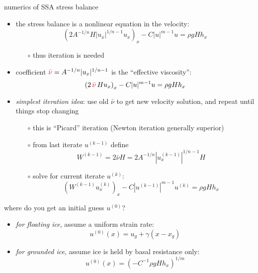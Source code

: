 \begin{frame}{numerics of SSA stress balance}

\begin{itemize}
\item the stress balance is a nonlinear equation in the velocity:
  $$\left(2 A^{-1/n} H |u_x|^{1/n - 1} u_x\right)_x - C|u|^{m-1}u = \rho g H h_x$$

\vspace{-2mm}
    \begin{itemize}
    \item[$\circ$] thus \alert{iteration is needed}    
    \end{itemize}
\item coefficient ${\color{red} \bar \nu} = A^{-1/n} |u_x|^{1/n-1}$ is the ``effective viscosity'':
   $$\left(2 \,{\color{red} \bar \nu}\, H u_x\right)_x - C |u|^{m-1} u = \rho g H h_x$$
\item \emph{simplest iteration idea}: use old $\bar\nu$ to get new velocity solution, and repeat until things stop changing
  \begin{itemize}
  \item[$\circ$] this is ``Picard'' iteration  (Newton iteration generally superior)
  \item[$\circ$] from last iterate $u^{(k-1)}$ define
     $$W^{(k-1)} = 2 \bar \nu H = 2 A^{-1/n} |u^{(k-1)}_x|^{1/n-1} H$$
  \item[$\circ$] solve for current iterate $u^{(k)}$:
     $$\left(W^{(k-1)} u^{(k)}_x\right)_x - C |u^{(k-1)}|^{m-1} u^{(k)} = \rho g H h_x$$
  \end{itemize}
\end{itemize}
\end{frame}


\begin{frame}{where do you get an initial guess $u^{(0)}$?}

\begin{itemize}
\item \emph{for floating ice}, assume a uniform strain rate:
   $$u^{(0)}(x) = u_g + \gamma (x-x_g)$$
\item \emph{for grounded ice}, assume ice is held by basal resistance only:
   $$u^{(0)}(x) = \left(-C^{-1} \rho g H h_x\right)^{1/m}$$
\end{itemize}
\end{frame}


